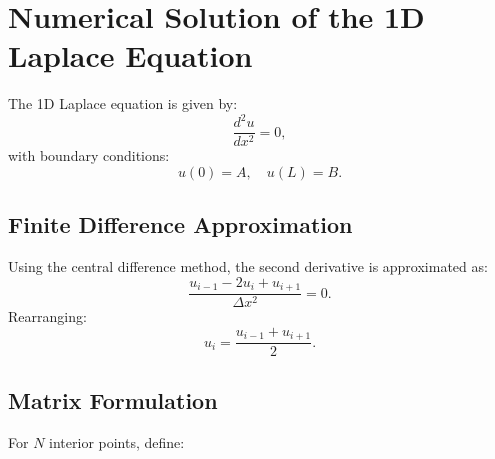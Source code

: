 
\section{Numerical Solution of the 1D Laplace Equation}
The 1D Laplace equation is given by:
\begin{equation}
    \frac{d^2 u}{dx^2} = 0,
\end{equation}
with boundary conditions:
\begin{equation}
    u(0) = A, \quad u(L) = B.
\end{equation}

\subsection{Finite Difference Approximation}
Using the central difference method, the second derivative is approximated as:
\begin{equation}
    \frac{u_{i-1} - 2u_i + u_{i+1}}{\Delta x^2} = 0.
\end{equation}
Rearranging:
\begin{equation}
    u_i = \frac{u_{i-1} + u_{i+1}}{2}.
\end{equation}

\subsection{Matrix Formulation}
For \( N \) interior points, define:

